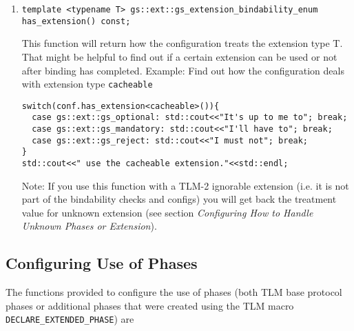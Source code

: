 \documentclass[a4paper,10pt]{article}          %
\begin{document}
\begin{enumerate}
\item
\verb|template <typename T> gs::ext::gs_extension_bindability_enum has_extension() const;|

This function will return how the configuration treats the extension type T. That might be helpful to find out if a certain extension can be used or not after binding has completed. Example: Find out how the configuration deals with extension type \verb|cacheable|

\begin{small}
\begin{verbatim}
switch(conf.has_extension<cacheable>()){
  case gs::ext::gs_optional: std::cout<<"It's up to me to"; break;
  case gs::ext::gs_mandatory: std::cout<<"I'll have to"; break;
  case gs::ext::gs_reject: std::cout<<"I must not"; break;
}
std::cout<<" use the cacheable extension."<<std::endl;
\end{verbatim}
\end{small}

Note: If you use this function with a TLM-2 ignorable extension (i.e. it is not part of the bindability checks and configs) you will get back the treatment value for unknown extension (see section \emph{Configuring How to Handle Unknown Phases or Extension}).

\end{enumerate}


\subsection{Configuring Use of Phases}

The functions provided to configure the use of phases (both TLM base protocol phases or additional phases that were created using the TLM macro \verb|DECLARE_EXTENDED_PHASE|) are
\end{document}
